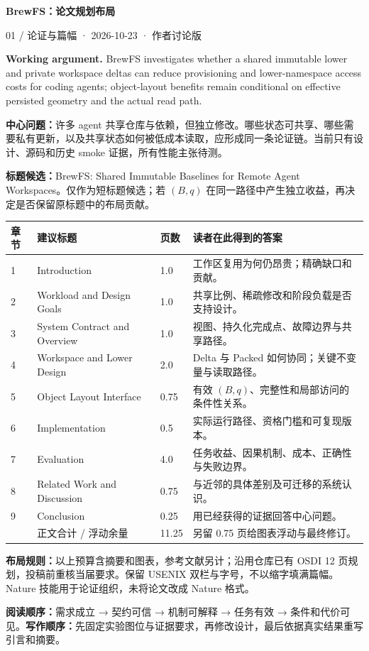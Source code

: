 \documentclass[UTF8,fontset=fandol,11pt]{ctexart}
\newcommand{\head}[2]{\textcolor{accent}{\Large\bfseries #1}\par\textcolor{accent}{#2}\par\medskip}
\begin{document}
\head{BrewFS：论文规划布局}{01 / 论证与篇幅 · 2026-10-23 · 作者讨论版}
\textbf{Working argument.} BrewFS investigates whether a shared immutable lower and private workspace deltas can reduce provisioning and lower-namespace access costs for coding agents; object-layout benefits remain conditional on effective persisted geometry and the actual read path.

\textbf{中心问题：}许多 agent 共享仓库与依赖，但独立修改。哪些状态可共享、哪些需要私有更新，以及共享状态如何被低成本读取，应形成同一条论证链。当前只有设计、源码和历史 smoke 证据，所有性能主张待测。

\textbf{标题候选：}BrewFS: Shared Immutable Baselines for Remote Agent Workspaces。仅作为短标题候选；若 $(B,q)$ 在同一路径中产生独立收益，再决定是否保留原标题中的布局贡献。

\begin{tabularx}{\linewidth}{@{}p{0.8cm}p{4.2cm}p{1cm}Y@{}}
\toprule 章节 & 建议标题 & 页数 & 读者在此得到的答案\\ & Introduction & 1.0 & 工作区复用为何仍昂贵；精确缺口和贡献。\\
2 & Workload and Design Goals & 1.0 & 共享比例、稀疏修改和阶段负载是否支持设计。\\
3 & System Contract and Overview & 1.0 & 视图、持久化完成点、故障边界与共享路径。\\
4 & Workspace and Lower Design & 2.0 & Delta 与 Packed 如何协同；关键不变量与读取路径。\\
5 & Object Layout Interface & 0.75 & 有效 $(B,q)$、完整性和局部访问的条件性关系。\\
6 & Implementation & 0.5 & 实际运行路径、资格门槛和可复现版本。\\
7 & Evaluation & 4.0 & 任务收益、因果机制、成本、正确性与失败边界。\\
8 & Related Work and Discussion & 0.75 & 与近邻的具体差别及可迁移的系统认识。\\
9 & Conclusion & 0.25 & 用已经获得的证据回答中心问题。\\\midrule
 & 正文合计 / 浮动余量 & 11.25 & 另留 0.75 页给图表浮动与最终修订。\\\bottomrule
\end{tabularx}

\textbf{布局规则：}以上预算含摘要和图表，参考文献另计；沿用仓库已有 OSDI 12 页规划，投稿前重核当届要求。保留 USENIX 双栏与字号，不以缩字填满篇幅。Nature 技能用于论证组织，未将论文改成 Nature 格式。

\textbf{阅读顺序：}需求成立 → 契约可信 → 机制可解释 → 任务有效 → 条件和代价可见。\textbf{写作顺序：}先固定实验图位与证据要求，再修改设计，最后依据真实结果重写引言和摘要。
\end{document}
